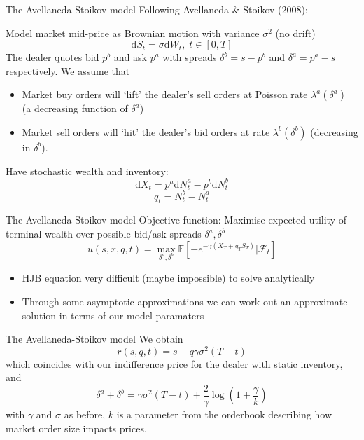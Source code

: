 \documentclass{beamer} %
\begin{document}
\begin{frame}{The Avellaneda-Stoikov model}
    Following Avellaneda \& Stoikov (2008):

    Model market mid-price as Brownian motion with variance $\sigma^2$ (no drift)
    $$\mathrm d S_t=\sigma \mathrm d W_t,\;t\in[0,T]$$
    The dealer quotes bid $p^b$ and ask $p^a$ with spreads $\delta^b=s-p^b$ and $\delta^a=p^a-s$
    respectively.
    We assume that 
    \begin{itemize}
        \item Market buy orders will `lift' the dealer's sell orders at Poisson rate $\lambda^a(\delta^a)$ (a decreasing function of $\delta^a$)
        \item Market sell orders will `hit' the dealer's bid orders at rate $\lambda^b(\delta^b)$ (decreasing in $\delta^b$).
    \end{itemize}
    Have stochastic wealth and inventory:
    \begin{equation}
        \mathrm dX_t=p^a\mathrm dN_t^a-p^b\mathrm dN_t^b
    \end{equation}
    \begin{equation}
        q_t=N_t^b-N_t^a
    \end{equation}
\end{frame}

\begin{frame}{The Avellaneda-Stoikov model}
    Objective function: Maximise expected utility of terminal wealth over possible bid/ask spreads $\delta^a,\delta^b$
    \begin{equation}
        u(s,x,q,t)=\max_{\delta^a,\delta^b}\mathbb{E}\left[-e^{-\gamma(X_T+q_TS_T)}|\mathcal{F}_t\right]
    \end{equation}
    \begin{itemize}
        \item HJB equation very difficult (maybe impossible) to solve analytically
        \item Through some asymptotic approximations we can work out an approximate solution in terms of our model paramaters
    \end{itemize}
\end{frame}

\begin{frame}{The Avellaneda-Stoikov model}
    We obtain
    \begin{equation}
        r(s,q,t)=s-q\gamma\sigma^2(T-t)
    \end{equation}
    which coincides with our indifference price for the dealer with static inventory, and
    \begin{equation}
        \delta^a+\delta^b=\gamma\sigma^2(T-t)+\frac{2}{\gamma}\log\left(1+\frac{\gamma}{k}\right)
    \end{equation}
    with $\gamma$ and $\sigma$ as before, $k$ is a parameter from the orderbook describing how 
    market order size impacts prices.
\end{frame}
\end{document}
